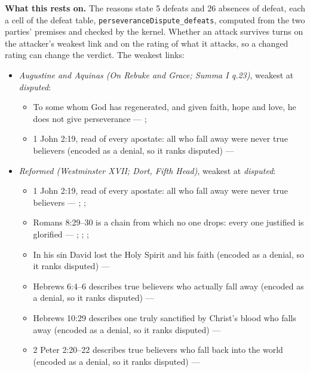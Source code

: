 \documentclass[11pt]{article}
\begin{document}
\par\noindent\textbf{What this rests on.} The reasons state 5 defeats and 26 absences of defeat, each a cell of the defeat table, \texttt{perseverance\allowbreak{}Dispute\_\allowbreak{}defeats}, computed from the two parties' premises and checked by the kernel. Whether an attack survives turns on the attacker's weakest link and on the rating of what it attacks, so a changed rating can change the verdict. The weakest links:
\begin{itemize}
\item \emph{Augustine and Aquinas (On Rebuke and Grace; Summa I q.23)}, weakest at \emph{disputed}:
\begin{itemize}
\item To some whom God has regenerated, and given faith, hope and love, he does not give perseverance --- \cite[478]{npnf1-05-1887}; \cite[On Rebuke and Grace, ch. 18]{npnf1-05-1887}
\item 1 John 2:19, read of every apostate: all who fall away were never true believers (encoded as a denial, so it ranks disputed) --- \cite[479--480]{npnf1-05-1887}
\end{itemize}
\item \emph{Reformed (Westminster XVII; Dort, Fifth Head)}, weakest at \emph{disputed}:
\begin{itemize}
\item 1 John 2:19, read of every apostate: all who fall away were never true believers --- \cite[594--595]{owen-works-11-perseverance}; \cite[191--192]{calvin-commentaries-catholic-epistles}; \cite[479--480]{npnf1-05-1887}
\item Romans 8:29–30 is a chain from which no one drops: every one justified is glorified --- \cite[582--583]{schaff-creeds-christendom-3-1977}; \cite[557]{schaff-creeds-christendom-3-1977}; \cite[384]{wesley-explanatory-notes-nt}; \cite[413]{wesley-works-9-1827}
\item In his sin David lost the Holy Spirit and his faith (encoded as a denial, so it ranks disputed) --- \cite[299--300]{calvin-psalms-2-1846}
\item Hebrews 6:4–6 describes true believers who actually fall away (encoded as a denial, so it ranks disputed) --- \cite[137--138]{calvin-hebrews-1853}
\item Hebrews 10:29 describes one truly sanctified by Christ’s blood who falls away (encoded as a denial, so it ranks disputed) --- \cite[545--546]{owen-works-23-1855}
\item 2 Peter 2:20–22 describes true believers who fall back into the world (encoded as a denial, so it ranks disputed) --- \cite[410--412]{calvin-commentaries-catholic-epistles}

\end{itemize}
\end{itemize}
\end{document}

